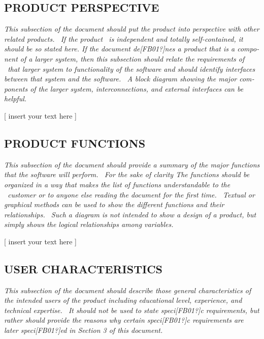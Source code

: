 \documentclass[twoside,letterpaper]{article}
\begin{document}
\subsection[PRODUCT
PERSPECTIVE]{\rmfamily\bfseries\color{black}
PRODUCT PERSPECTIVE}
{\color{black}
\foreignlanguage{english}{\textit{This subsection of the document should
put the product into perspective with other related products. \ If the
product \ is independent and totally self-contained, it should be so
stated here. If the document de[FB01?]nes a product that is a component
of a larger system, then this subsection should relate the requirements
of \ that larger system to functionality of the software and should
identify interfaces between that system and the software. \ A block
diagram showing the major components of the larger system,
interconnections, and external interfaces can be
helpful.}}\foreignlanguage{english}{\textbf{\textit{ }}}}

{\color{black}
[ insert your text here ]}

\subsection[PRODUCT
FUNCTIONS]{\rmfamily\bfseries\color{black}
PRODUCT FUNCTIONS}
{\itshape\color{black}
This subsection of the document should provide a summary of the major
functions that the software will perform. \ For the sake of clarity The
functions should be organized in a way that makes the list of functions
understandable to the \ customer or to anyone else reading the document
for the first time. \ Textual or graphical methods can be used to show
the different functions and their relationships. \ Such a diagram is
not intended to show a design of a product, but simply shows the
logical relationships among variables.}

{\color{black}
[ insert your text here ]}

\subsection[USER
CHARACTERISTICS]{\rmfamily\bfseries\color{black}
USER CHARACTERISTICS}
{\itshape\color{black}
This subsection of the document should describe those general
characteristics of the intended users of the product including
educational level, experience, and technical expertise. \ It should not
be used to state speci[FB01?]c requirements, but rather should provide
the reasons why certain speci[FB01?]c requirements are later
speci[FB01?]ed in Section 3 of this document.}
\end{document}
